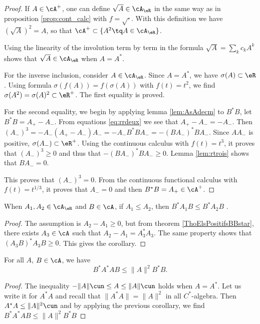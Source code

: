 \begin{proof}
If $A\in\cA^+$, one can define $\sqrt{A}\in\cA_{\eR}$ in the same way as in proposition \ref{prop:cont_calc} with $f=\sqrt{\cdot}$. With this definition we have $(\sqrt{A})^2=A$, so that $\cA^+\subset\{ A^2\tq A\in\cA_{\eR} \}$.

Using the linearity of the involution term by term in the formula $\sqrt{A}=\sum_k c_kA^k$ shows that $\sqrt{A}\in\cA_{\eR}$ when $A=A^*$. 

For the inverse inclusion, consider $A\in\cA_{\eR}$. Since $A=A^*$, we have $\sigma(A)\subset\eR$. Using formula $\sigma(f(A))=f(\sigma(A))$ with $f(t)=t^2$, we find $\sigma(A^2)=\sigma(A)^2\subset\eR^+$. The first equality is proved.
 
For the second equality, we begin by applying lemma \ref{lem:AsAdecm} to $B^*B$, let $B^*B=A_+-A_-$. From equations \eqref{eq:rrdeux} we see that $A_+-A_-=-A_-$. Then $(A_-)^3=-A_-(A_+-A_-)A_-=-A_-B^*BA_-=-(BA_-)^*BA_-$. Since $AA_-$ is positive, $\sigma(A_-)\subset\eR^+$. Using the continuous calculus with $f(t)=t^3$, it proves that $(A_-)^3\geq 0$ and thus that $-(BA_-)^*BA_-\geq 0$. Lemma \ref{lem:rtrois} shows that $BA_-=0$.

This proves that $(A_-)^3=0$. From the continuous functional calculus with $f(t)=t^{1/3}$, it proves that $A_-=0$ and then $B^*B=A_+\in\cA^+$.
\end{proof}
\begin{corollary}
When $A_1,A_2\in\cA_{\eR}$ and $B\in\cA$, if $A_1\leq A_2$, then $B^*A_1B\leq B^*A_2B$ .
\end{corollary}

\begin{proof}
The assumption is $A_2-A_1\geq 0$, but from theorem \ref{ThoElsPositifsBBstar}, there exists $A_3\in\cA$ such that $A_2-A_1=A^*_3A_3$. The same property shows that $(A_3B)^*A_3B\geq 0$. This gives the corollary.
\end{proof}


\begin{corollary}
For all $A$, $B\in\cA$, we have
\[ 
  B^*A^*AB\leq \| A \|^2B^*B.
\]
 \label{cor:BeAAeB}
\end{corollary}

\begin{proof}
The inequality $-\| A \|\cun\leq A\leq \| A \|\cun$ holds when $A=A^*$. Let us write it for $A^*A$ and recall that $\| A^*A \|=\| A \|^2$ in all $C^*$-algebra. Then $A^*A\leq \| A \|^2\cun$ and by applying the previous corollary, we find $B^*A^*AB\leq\| A \|^2B^*B$ 
\end{proof}



